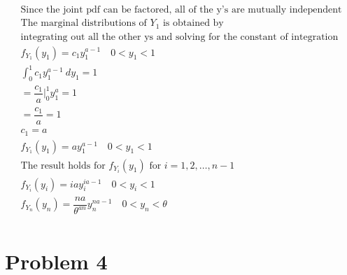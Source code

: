 \documentclass{article}
\begin{document}
\begin{flushleft}
\begin{multline*}
\text{Since the joint pdf can be factored, all of the y's are mutually independent}\\ 
\text{The marginal distributions of } Y_1 \text{ is obtained by}\\
\text{integrating out all the other ys and solving for the constant of integration}\\
f_{Y_1}(y_1)=c_1y_1^{a-1} \quad 0<y_1<1\\
\int_{0}^{1}c_1y_1^{a-1} \ dy_1=1\\
=\dfrac{c_1}{a}\bigg|_{0}^{1}y_1^{a}=1\\
=\dfrac{c_1}{a}=1\\
c_1=a\\
f_{Y_1}(y_1)=ay_1^{a-1} \quad 0<y_1<1\\
\text{The result holds for } f_{Y_i}(y_1) \text{ for } i=1,2,\dots,n-1\\
f_{Y_i}(y_i)=iay_i^{ia-1} \quad 0<y_i<1\\
f_{Y_n}(y_n)=\dfrac{na}{\theta^{an}}y_n^{na-1}\quad 0<y_n<\theta\\
\end{multline*}

	\section*{Problem 4}
	

\end{flushleft}
\end{document}
